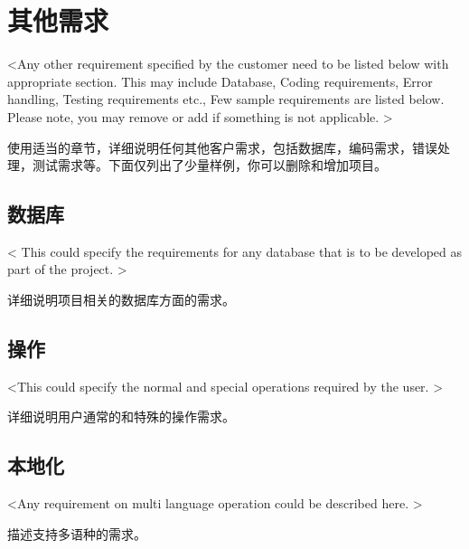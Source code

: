\chapter{其他需求}
<Any other requirement specified by the customer need to be listed below with appropriate section. This may include Database, Coding requirements, Error handling, Testing requirements etc., Few sample requirements are listed below. Please note, you may remove or add if something is not applicable. >

使用适当的章节，详细说明任何其他客户需求，包括数据库，编码需求，错误处理，测试需求等。下面仅列出了少量样例，你可以删除和增加项目。
\section{数据库}
< This could specify the requirements for any database that is to be developed as part of the project. >

详细说明项目相关的数据库方面的需求。
\section{操作}
<This could specify the normal and special operations required by the user. >

详细说明用户通常的和特殊的操作需求。
\section{本地化}
<Any requirement on multi language operation could be described here. >

描述支持多语种的需求。
